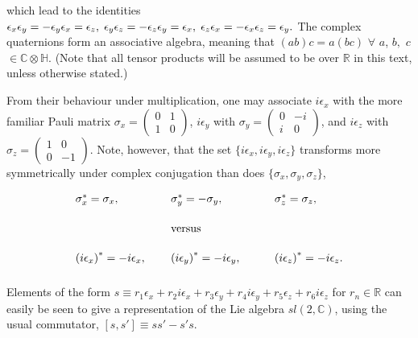 \documentclass[letterpaper,12pt,titlepage,oneside,final]{book}
\newcommand{\CH}{\mathbb{C}\otimes\mathbb{H}}
\begin{document}
\noindent which lead to the identities ${\epsilon_x} {\epsilon_y} = -{\epsilon_y}{\epsilon_x} =  {\epsilon_z}, \hspace{0.1cm}  {\epsilon_y} {\epsilon_z} = -{\epsilon_z}{\epsilon_y} =  {\epsilon_x}, \hspace{0.1cm}  {\epsilon_z}{\epsilon_x} = - {\epsilon_x}{\epsilon_z} = {\epsilon_y}.$  The complex quaternions form an associative algebra, meaning that $\left(ab\right)c=a\left(bc\right)$ $\forall$ $a$, $b,$ $c$ $\in\CH$.  (Note that all tensor products will be assumed to be over $\mathbb{R}$ in this text, unless otherwise stated.)

From their behaviour under multiplication, one may associate $i{\epsilon_x}$ with the more familiar Pauli matrix $\sigma_x = \left( \begin{smallmatrix}0&1\\1&0 \end{smallmatrix}  \right)$, $i{\epsilon_y}$ with $\sigma_y = \left( \begin{smallmatrix}0&-i\\i&0 \end{smallmatrix}  \right)$, and $i{\epsilon_z}$ with $\sigma_z = \left( \begin{smallmatrix}1&0\\0&-1 \end{smallmatrix}  \right)$.  Note, however, that the set $\{ i{\epsilon_x}, i{\epsilon_y}, i{\epsilon_z}\}$ transforms more symmetrically under complex conjugation than does $\{\sigma_x, \sigma_y, \sigma_z\}$,

\begin{equation}\begin{array}{lll} \sigma_x^* = \sigma_x, \hspace{13mm}&   \sigma_y^* = -\sigma_y,  \hspace{13mm}&\sigma_z^* = \sigma_z,  \vspace{5mm}  \\
 & \textup{versus} & \vspace{5mm}  \\
  \left(i{\epsilon_x}\right)^* = -i{\epsilon_x}, &   \left(i{\epsilon_y}\right)^* = -i{\epsilon_y},  & \left(i{\epsilon_z}\right)^* = -i{\epsilon_z}. \vspace{2mm}
 
\end{array}\end{equation}


Elements of the form $s\equiv r_1 {\epsilon_x} + r_2 i{\epsilon_x} + r_3 {\epsilon_y} + r_4  i{\epsilon_y} + r_5 {\epsilon_z} + r_6 i{\epsilon_z} $  for $r_n\in \mathbb{R}$ can easily be seen to give a representation of the Lie algebra $sl(2,\mathbb{C})$, using the usual commutator, $\left[ s, s' \right] \equiv ss' - s's$.  
\end{document}
